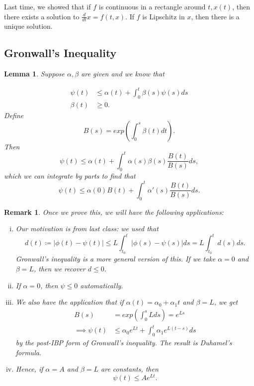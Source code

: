 \documentclass{tufte-handout}
\newtheorem{lemma}[thm]{Lemma}
\newtheorem{rmk}[thm]{Remark}
\theoremstyle{definition}
\begin{document}
Last time, we showed that if $f$ is continuous in a rectangle around $t, x(t)$, then there exists a solution to $\frac{d}{dt}x = f(t,x)$. If $f$ is Lipschitz in $x$, then there is a unique solution.

\subsection{Gronwall's Inequality}

\begin{lemma}
Suppose $\alpha,\beta$ are given and we know that 

\begin{align}
	\psi(t) &\le \alpha(t) + \int_{0}^{t} \beta(s)\psi(s)ds \label{10-28-a1} \\
	\beta(t) &\ge 0 \label{10-28-a2}.
\end{align}
Define \[
	B(s) = exp\left( \int_{0}^{s} \beta(t)dt  \right)
.\] Then \[
	\psi(t) \le \alpha(t) + \int_{0}^{t} \alpha(s)\beta(s) \frac{B(t)}{B(s)}ds 
,\] which we can integrate by parts to find that \[
	\psi(t) \le \alpha(0) B(t) + \int_{0}^{t} \alpha'(s) \frac{B(t)}{B(s)}ds 
.\] 
\end{lemma}

\begin{rmk}
	Once we prove this, we will have the following applications: 
	\begin{enumerate}[(i)]
		\item Our motivation is from last class: we used that \[
		d(t) \coloneqq \left| \phi(t) - \psi(t) \right| \le L \int_{t_0}^{t} \left| \phi(s) - \psi(s) \right|ds = L \int_{t_0}^{t} d(s) ds  
		.\] Gronwall's inequality is a more general version of this. If we take $\alpha = 0$ and $\beta = L$, then we recover $d \le 0$.
		\item If $\alpha = 0$, then $\psi \le 0$ automatically.
		\item We also have the application that if $\alpha(t) = \alpha_0 + \alpha_1 t$ and $\beta = L$, we get
		\begin{align*}
			B(s) &= exp(\int_{0}^{s} Lds) = e^{Ls} \\ 
			\implies \psi(t) &\le \alpha_0 e^{Lt} + \int_{0}^{t} \alpha_1 e^{L(t-s)}ds 
			\end{align*} by the post-IBP form of Gronwall's inequality. The result is Duhamel's formula.
		\item Hence, if $\alpha = A$ and $\beta = L$ are constants, then \[
			\psi(t) \le Ae^{Lt}
		.\] 
	\end{enumerate}
	


\end{rmk}
\end{document}
